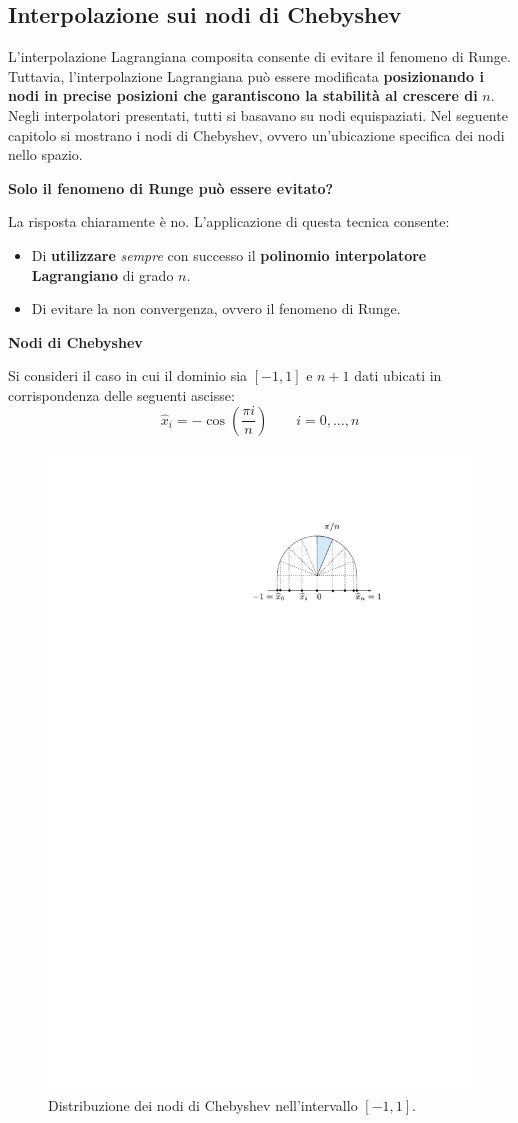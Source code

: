 \subsection{Interpolazione sui nodi di Chebyshev}

L'interpolazione Lagrangiana composita consente di evitare il fenomeno di Runge. Tuttavia, l'interpolazione Lagrangiana può essere modificata \textbf{posizionando i nodi in precise posizioni che garantiscono la stabilità al crescere di} $n$. Negli interpolatori presentati, tutti si basavano su nodi equispaziati. Nel seguente capitolo si mostrano i nodi di Chebyshev, ovvero un'ubicazione specifica dei nodi nello spazio.

\highspace
\begin{flushleft}
	\textcolor{Green3}{ \textbf{Solo il fenomeno di Runge può essere evitato?}}
\end{flushleft}
La risposta chiaramente è no. L'applicazione di questa tecnica consente:
\begin{itemize}
	\item Di \textbf{utilizzare} \emph{sempre} con successo il \textbf{polinomio interpolatore Lagrangiano} di grado $n$.
	
	\item Di evitare la non convergenza, ovvero il fenomeno di Runge.
\end{itemize}

\highspace
\begin{flushleft}
	\textcolor{Red2}{ \textbf{Nodi di Chebyshev}}
\end{flushleft}
Si consideri il caso in cui il dominio sia $\left[-1, 1\right]$ e $n+1$ dati ubicati in corrispondenza delle seguenti ascisse:
\begin{equation}
	\widehat{x}_{i} = -\cos\left(\dfrac{\pi i}{n}\right) \hspace{2em} i = 0, \dots, n
\end{equation}
\begin{figure}[!htp]
	\centering
	\includegraphics[width=.5\textwidth]{img/nodi-di-chebyshev-1.pdf}
	\caption{Distribuzione dei nodi di Chebyshev nell'intervallo $\left[-1, 1\right]$.}
\end{figure}

